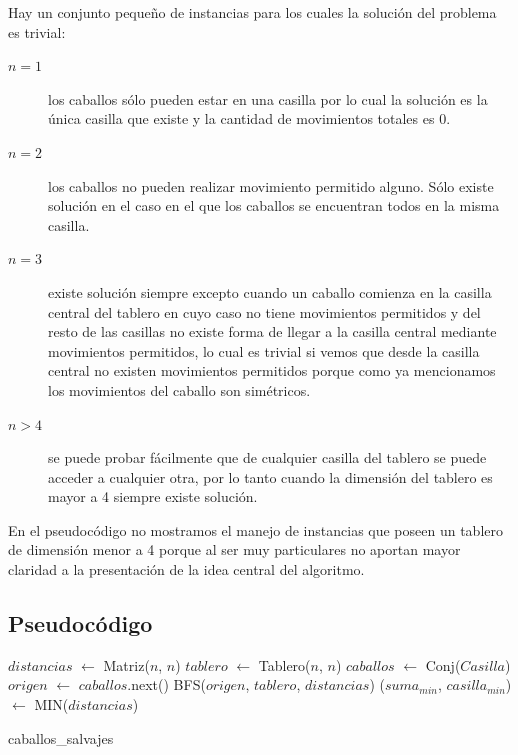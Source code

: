 Hay un conjunto pequeño de instancias para los cuales la solución del problema es trivial:
\begin{description}
  \item[$n = 1$] los caballos sólo pueden estar en una casilla por lo cual la solución es la única casilla
    que existe y la cantidad de movimientos totales es 0.
  \item[$n = 2$] los caballos no pueden realizar movimiento permitido alguno. Sólo existe solución en el caso
    en el que los caballos se encuentran todos en la misma casilla.
  \item[$n = 3$] existe solución siempre excepto cuando un caballo comienza en la casilla central del tablero
    en cuyo caso no tiene movimientos permitidos y del resto de las casillas no existe forma de llegar a la
    casilla central mediante movimientos permitidos, lo cual es trivial si vemos que desde la casilla central
    no existen movimientos permitidos porque como ya mencionamos los movimientos del caballo son simétricos.
  \item[$n > 4$] se puede probar fácilmente que de cualquier casilla del tablero se puede acceder a cualquier otra,
    por lo tanto cuando la dimensión del tablero es mayor a 4 siempre existe solución.
\end{description}
En el pseudocódigo no mostramos el manejo de instancias que poseen un tablero de dimensión menor a 4 porque
al ser muy particulares no aportan mayor claridad a la presentación de la idea central del algoritmo.

\subsection{Pseudocódigo}
\begin{algorithm}[H]
  \begin{algorithmic}
    \STATE $distancias$ $\gets$ Matriz($n$, $n$)
    \STATE $tablero$ $\gets$ Tablero($n$, $n$)
    \STATE $caballos$ $\gets$ Conj($Casilla$)
      \STATE $origen$ $\gets$ $caballos$.next()
      \STATE BFS($origen$, $tablero$, $distancias$)
    \ENDWHILE
    \STATE ($suma_{min}$, $casilla_{min}$) $\gets$ MIN($distancias$)
    \caption{caballos\_salvajes}
  \end{algorithmic}
\end{algorithm}

